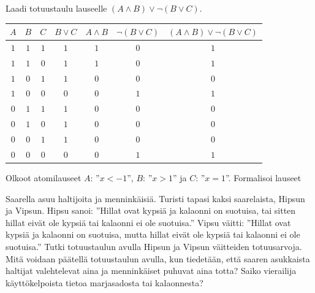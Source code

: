 \begin{tehtavasivu}
\begin{tehtava}
\end{tehtava}

\begin{tehtava}
    Laadi totuustaulu lauseelle $(A\land B)\lor \lnot (B\lor C)$.

    \begin{vastaus}
        \begin{center}
		    \begin{tabular}{|c|c|c|c|c|c|c|}\hline
		    $A$ & $B$ & $C$ & $B\lor C$ & $A\land B$ & $\lnot (B\lor C)$ & $(A\land B)\lor \lnot (B\lor C)$\\ \hline
		    $1$ & $1$ & $1$ & $1$ & $1$ & $0$ & $1$  \\ %
		    $1$ & $1$ & $0$ & $1$ & $1$ & $0$ & $1$  \\
		    $1$ & $0$ & $1$ & $1$ & $0$ & $0$ & $0$  \\
		    $1$ & $0$ & $0$ & $0$ & $0$ & $1$ & $1$  \\
		    $0$ & $1$ & $1$ & $1$ & $0$ & $0$ & $0$  \\
		    $0$ & $1$ & $0$ & $1$ & $0$ & $0$ & $0$  \\
		    $0$ & $0$ & $1$ & $1$ & $0$ & $0$ & $0$  \\
		    $0$ & $0$ & $0$ & $0$ & $0$ & $1$ & $1$  \\ \hline
\end{tabular}
\end{center}
    \end{vastaus}
    
\end{tehtava}

\begin{tehtava}
    Olkoot atomilauseet $A$: ''$x < -1$'', $B$: ''$x > 1$''  ja $C$: ''$x = 1$''. Formalisoi  lauseet

    \begin{vastaus}
    \end{vastaus}
    
\end{tehtava}

\begin{tehtava}
    Saarella asuu haltijoita ja menninkäisiä. Turisti tapasi kaksi saarelaista, Hipsun ja Vipsun. Hipsu sanoi: ''Hillat ovat kypsiä ja kalaonni on suotuisa, tai sitten hillat eivät ole kypsiä tai kalaonni ei ole suotuisa.'' Vipsu väitti: ''Hillat ovat kypsiä ja kalaonni on suotuisa, mutta hillat eivät ole kypsiä tai kalaonni ei ole suotuisa.'' Tutki totuustaulun avulla Hipsun ja Vipsun väitteiden totuusarvoja. Mitä voidaan päätellä totuustaulun avulla, kun tiedetään, että saaren asukkaista haltijat valehtelevat aina ja menninkäiset puhuvat aina totta? Saiko vierailija käyttökelpoista tietoa marjasadosta tai kalaonnesta?


\end{tehtava}
\end{tehtavasivu}

